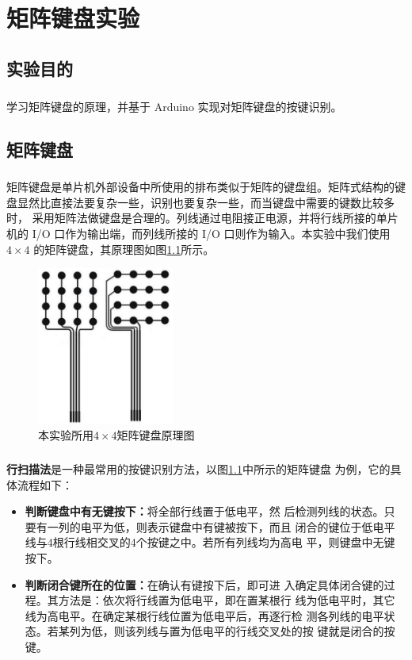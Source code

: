 \documentclass[UTF8, oneside]{ctexbook}
\begin{document}
\chapter{矩阵键盘实验}
\section{实验目的}
\paragraph{}
学习矩阵键盘的原理，并基于 Arduino 实现对矩阵键盘的按键识别。

\section{矩阵键盘}
\paragraph{}
矩阵键盘是单片机外部设备中所使用的排布类似于矩阵的键盘组。矩阵式结构的键
盘显然比直接法要复杂一些，识别也要复杂一些，而当键盘中需要的键数比较多时，
采用矩阵法做键盘是合理的。列线通过电阻接正电源，并将行线所接的单片机的 
I/O 口作为输出端，而列线所接的 I/O 口则作为输入。本实验中我们使用$4\times 4$
的矩阵键盘，其原理图如图\ref{board}所示。
\begin{figure}[h]
    \centering
    \includegraphics[width=0.4\textwidth]{./result/basic/5/board.png}
    \caption{本实验所用$4\times4$矩阵键盘原理图}
    \label{board}
\end{figure}

\paragraph{}
\textbf{行扫描法}是一种最常用的按键识别方法，以图\ref{board}中所示的矩阵键盘
为例，它的具体流程如下：
\begin{itemize}
    \item[(1)] \textbf{判断键盘中有无键按下：}将全部行线置于低电平，然
    后检测列线的状态。只要有一列的电平为低，则表示键盘中有键被按下，而且
    闭合的键位于低电平线与4根行线相交叉的4个按键之中。若所有列线均为高电
    平，则键盘中无键按下。

    \item[(2)] \textbf{判断闭合键所在的位置：}在确认有键按下后，即可进
    入确定具体闭合键的过程。其方法是：依次将行线置为低电平，即在置某根行
    线为低电平时，其它线为高电平。在确定某根行线位置为低电平后，再逐行检
    测各列线的电平状态。若某列为低，则该列线与置为低电平的行线交叉处的按
    键就是闭合的按键。
\end{itemize}
\end{document}
